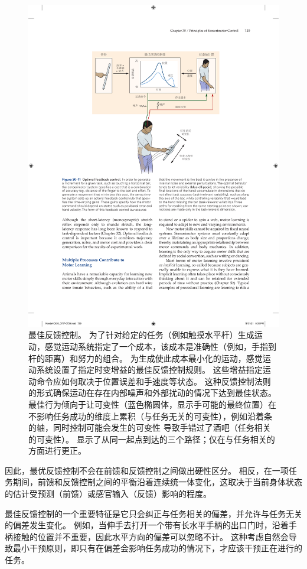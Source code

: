 \begin{figure}[htbp]
	\centering
	\includegraphics[width=0.8\linewidth]{chap30/fig_30_11}
	\caption{最佳反馈控制。
		为了针对给定的任务（例如触摸水平杆）生成运动，感觉运动系统指定了一个成本，该成本是准确性（例如，手指到杆的距离）和努力的组合。
		为生成使此成本最小化的运动，感觉运动系统设置了指定时变增益的最佳反馈控制规则。
		这些增益指定运动命令应如何取决于位置误差和手速度等状态。
		这种反馈控制法则的形式确保运动在存在内部噪声和外部扰动的情况下达到最佳状态。
		最佳行为倾向于让可变性（蓝色椭圆体，显示手可能的最终位置）在不影响任务成功的维度上累积（与任务无关的可变性），例如沿着条的轴，同时控制可能会发生的可变性 导致手错过了酒吧（任务相关的可变性）。
		显示了从同一起点到达的三个路径；仅在与任务相关的方面进行更正。}
	\label{fig:30_11}
\end{figure}


因此，最优反馈控制不会在前馈和反馈控制之间做出硬性区分。
相反，在一项任务期间，前馈和反馈控制之间的平衡沿着连续统一体变化，这取决于当前身体状态的估计受预测（前馈）或感官输入（反馈）影响的程度。


最佳反馈控制的一个重要特征是它只会纠正与任务相关的偏差，并允许与任务无关的偏差发生变化。
例如，当伸手去打开一个带有长水平手柄的出口门时，沿着手柄接触的位置并不重要，因此水平方向的偏差可以忽略不计。
这种考虑自然会导致最小干预原则，即只有在偏差会影响任务成功的情况下，才应该干预正在进行的任务。


